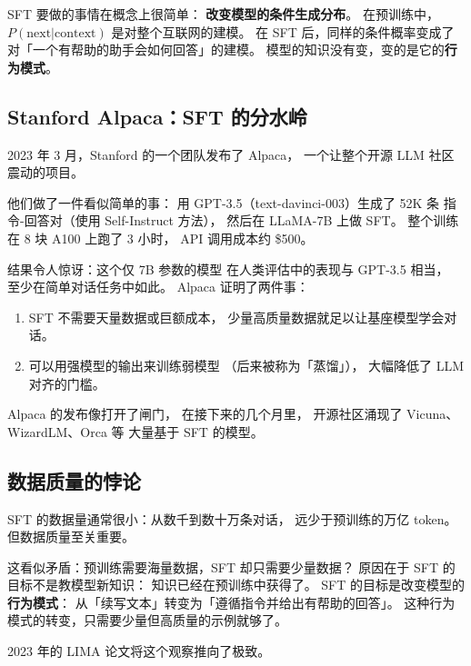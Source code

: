 SFT 要做的事情在概念上很简单：
\textbf{改变模型的条件生成分布}。
在预训练中，$P(\text{next} | \text{context})$ 是对整个互联网的建模。
在 SFT 后，同样的条件概率变成了
对「一个有帮助的助手会如何回答」的建模。
模型的知识没有变，变的是它的\textbf{行为模式}。

\subsection{Stanford Alpaca：SFT 的分水岭}

2023 年 3 月，Stanford 的一个团队发布了 Alpaca，
一个让整个开源 LLM 社区震动的项目。


他们做了一件看似简单的事：
用 GPT-3.5（text-davinci-003）生成了 52K 条
指令-回答对（使用 Self-Instruct 方法），
然后在 LLaMA-7B 上做 SFT。
整个训练在 8 块 A100 上跑了 3 小时，
API 调用成本约 \$500。

结果令人惊讶：这个仅 7B 参数的模型
在人类评估中的表现与 GPT-3.5 相当，
至少在简单对话任务中如此。
Alpaca 证明了两件事：
\begin{enumerate}[noitemsep]
  \item SFT 不需要天量数据或巨额成本，
        少量高质量数据就足以让基座模型学会对话。
  \item 可以用强模型的输出来训练弱模型
       （后来被称为「蒸馏」），
        大幅降低了 LLM 对齐的门槛。
\end{enumerate}

Alpaca 的发布像打开了闸门，
在接下来的几个月里，
开源社区涌现了 Vicuna、WizardLM、Orca 等
大量基于 SFT 的模型。

\subsection{数据质量的悖论}

SFT 的数据量通常很小：从数千到数十万条对话，
远少于预训练的万亿 token。
但数据质量至关重要。

这看似矛盾：预训练需要海量数据，SFT 却只需要少量数据？
原因在于 SFT 的目标不是教模型新知识：
知识已经在预训练中获得了。
SFT 的目标是改变模型的\textbf{行为模式}：
从「续写文本」转变为「遵循指令并给出有帮助的回答」。
这种行为模式的转变，只需要少量但高质量的示例就够了。

2023 年的 LIMA 论文将这个观察推向了极致。


